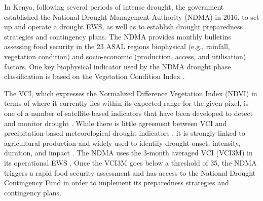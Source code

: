 \documentclass[review]{elsarticle}
\begin{document}
In Kenya, following several periods of intense drought, the government established the National Drought Management Authority (NDMA) in 2016, to set up and operate a drought EWS, as well as to establish drought preparedness strategies and contingency plans. The NDMA provides monthly bulletins assessing food security in the 23 ASAL regions   biophysical (e.g., rainfall, vegetation condition) and socio-economic (production, access, and utilisation) factors. One key biophysical indicator used by the NDMA drought phase classification is based on the Vegetation Condition Index  \citep[VCI,][]{KOGAN199591,rs8040267,RULINDA201132,ROJAS2011343}. 

{\color{blue} The VCI, which expresses the Normalized Difference Vegetation Index (NDVI) in terms of where it currently lies within its expected range for the given pixel, is one of a number of satellite-based indicators that have been developed to detect and monitor drought \citep{zargar2011review}. While there is little agreement between VCI and precipitation-based meteorological drought indicators \citep{quiring2010evaluating,BHUIYAN2006289}, it is strongly linked to agricultural production and widely used to identify drought onset, intensity, duration, and impact \citep{rs8030224}. The NDMA uses the 3-month averaged VCI (VCI3M) in its operational EWS \citep{rs8040267}. Once the VCI3M goes below a threshold of 35, the NDMA triggers a rapid food security assessment and has access to the National Drought Contingency Fund in order to implement its preparedness strategies and contingency plans.}


\end{document}
